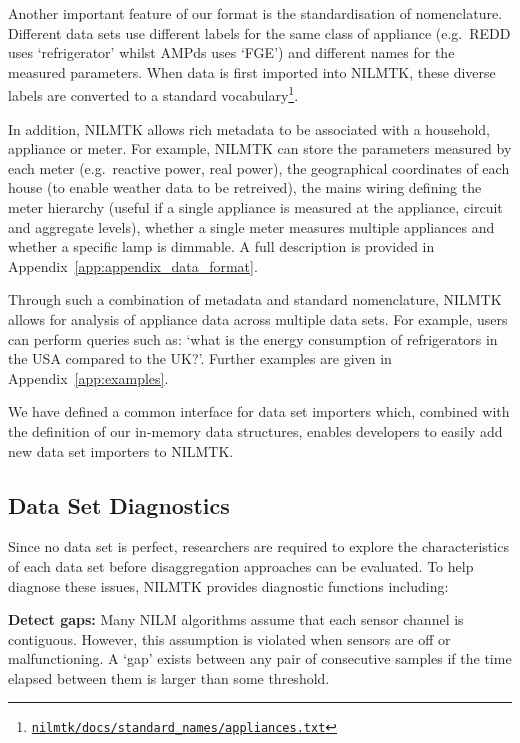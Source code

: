 \documentclass{sig-alternate}
\newcommand{\appref}[1]{Appendix~\ref{#1}}
\begin{document}
Another important feature of our format is the standardisation of nomenclature.  Different data sets use different labels for the same class of appliance (e.g.\ REDD uses `refrigerator' whilst AMPds uses `FGE') and different names for the measured parameters.  When data is first imported into NILMTK, these diverse labels are converted to a standard vocabulary\footnote{\href{https://github.com/nilmtk/nilmtk/blob/master/docs/standard_names/appliances.txt}{\texttt{nilmtk/docs/standard\_names/appliances.txt}}}.

In addition, NILMTK allows rich metadata to be associated with a
household, appliance or meter.  For example, NILMTK can store the
parameters measured by each meter (e.g.\ reactive power, real power),
the geographical coordinates of each house (to enable weather data to be retreived), the mains wiring
defining the meter hierarchy (useful if a single appliance is measured
at the appliance, circuit and aggregate levels), whether a single
meter measures multiple appliances and whether a specific lamp is
dimmable. A full description is provided in
\appref{app:appendix_data_format}.

Through such a combination of metadata and standard nomenclature, NILMTK allows for analysis of appliance data across multiple data sets. For example, users can perform queries such as:
`what is the energy consumption of refrigerators in the USA
compared to the UK?'. Further examples are given in
Appendix~\ref{app:examples}.

We have defined a common interface for data set importers
which, combined with the definition of our in-memory data structures,
enables developers to easily add new data set
importers to NILMTK.

\subsection{Data Set Diagnostics}
\label{sec:diagnostic_definitions}

\noindent
Since no data set is perfect, researchers are required to explore the characteristics of each data set before
disaggregation approaches can be evaluated.  To help diagnose these issues, NILMTK
provides diagnostic functions including:

\textbf{Detect gaps:} Many NILM algorithms assume that each sensor channel is
contiguous. However, this assumption is violated when sensors are off or
malfunctioning.  A `gap' exists between any pair of consecutive
samples if the time elapsed between them is larger than
some threshold.
\end{document}
